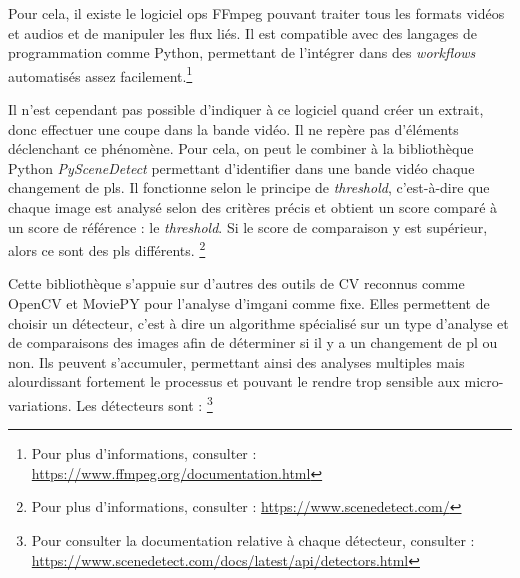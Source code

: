 \label{FFmpeg} Pour cela, il existe le logiciel \gls{ops} FFmpeg pouvant traiter tous les formats vidéos et audios et de manipuler les flux liés. Il est compatible avec des langages de programmation comme Python, permettant de l'intégrer dans des \textit{workflows} automatisés assez facilement.\footnote{Pour plus d'informations, consulter : \url{https://www.ffmpeg.org/documentation.html}}\newline

Il n'est cependant pas possible d'indiquer à ce logiciel quand créer un extrait, donc effectuer une coupe dans la bande vidéo. Il ne repère pas d'éléments déclenchant ce phénomène. \label{PyScene} Pour cela, on peut le combiner à la bibliothèque Python \textit{PySceneDetect} permettant d'identifier dans une bande vidéo chaque changement de \glspl{pl}. Il fonctionne selon le principe de \textit{threshold}, c'est-à-dire que chaque image est analysé selon des critères précis et obtient un score comparé à un score de référence : le \textit{threshold}. Si le score de comparaison y est supérieur, alors ce sont des \glspl{pl} différents. \footnote{Pour plus d'informations, consulter : \url{https://www.scenedetect.com/}} 

Cette bibliothèque s'appuie sur d'autres des outils de \gls{CV} reconnus comme OpenCV et MoviePY pour l'analyse d'\gls{imgani} comme fixe. Elles permettent de choisir un détecteur, c'est à dire un algorithme spécialisé sur un type d'analyse et de comparaisons des images afin de déterminer si il y a un changement de \gls{pl} ou non. Ils peuvent s'accumuler, permettant ainsi des analyses multiples mais alourdissant fortement le processus et pouvant le rendre trop sensible aux micro-variations. Les détecteurs sont : \footnote{Pour consulter la documentation relative à chaque détecteur, consulter : \url{https://www.scenedetect.com/docs/latest/api/detectors.html}} \label{detecteurs}


